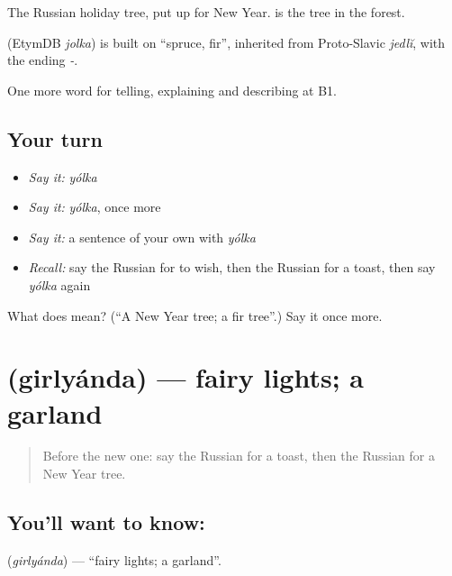 The Russian holiday tree, put up for New Year. \emph{} is the tree in the forest.

\begin{cousinweb}
\emph{} (EtymDB \emph{jolka}) is built on \emph{} \textquotedblleft{}spruce, fir\textquotedblright{}, inherited from Proto-Slavic \emph{jedlĭ}, with the ending \emph{-}.
\end{cousinweb}

\begin{grammarlens}[title={What you've built}]
One more word for telling, explaining and describing at B1.
\end{grammarlens}

\subsection*{Your turn}
\begin{itemize}
\raggedright
  \item \emph{Say it:} \emph{yólka}
  \item \emph{Say it:} \emph{yólka}, once more
  \item \emph{Say it:} a sentence of your own with \emph{yólka}
  \item \emph{Recall:} say the Russian for to wish, then the Russian for a toast, then say \emph{yólka} again
\end{itemize}

\begin{tcolorbox}[breakable,colback=teal!4,colframe=teal!35!black,title={Before you move on}]
What does  mean? (\textquotedblleft{}A New Year tree; a fir tree\textquotedblright{}.) Say it once more.
\end{tcolorbox}
\section[\texorpdfstring{\ru{гирлянда} (girlyánda)}{гирлянда (girlyánda)}]{ (girlyánda) — fairy lights; a garland}

\label{lesson:RU-C313-girlyanda}



\begin{quote}
Before the new one: say the Russian for a toast, then the Russian for a New Year tree.
\end{quote}

\subsection*{You'll want to know: }
\textbf{} (\emph{girlyánda}) — \textquotedblleft{}fairy lights; a garland\textquotedblright{}.


